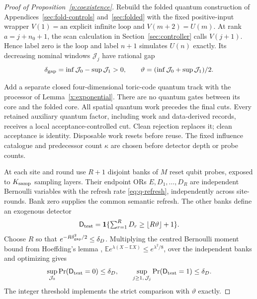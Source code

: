 \begin{proof}[Proof of Proposition~\ref{p:coexistence}]
Rebuild the folded quantum construction of Appendices~\ref{sec:fold-controls}
and~\ref{sec:folded} with the fixed positive-input wrapper
\(V(1)=\text{an explicit infinite loop}\) and \(V(m+2)=U(m)\).
At rank \(a=j+n_0+1\), the scan calculation in
Section~\ref{sec:controller} calls \(V(j+1)\). Hence label zero
is the loop and label \(n+1\) simulates \(U(n)\) exactly.
Its decreasing nominal windows \(\mathcal J_j\) have rational gap
\[
 \delta_{\rm gap}=\inf \mathcal J_0-\sup \mathcal J_1>0,\qquad
 \vartheta=(\inf \mathcal J_0+\sup \mathcal J_1)/2.
\]

Add a separate closed four-dimensional toric-code quantum track
with the processor of Lemma~\ref{x:exponential}. There are no quantum
gates between its core and the folded core. All spatial quantum
work precedes the final cuts. Every retained auxiliary quantum
factor, including work and data-derived records, receives a local
acceptance-controlled cut. Clean rejection replaces it; clean
acceptance is identity. Disposable work resets before reuse.
The fixed influence catalogue and predecessor count \(\kappa\)
are chosen before detector depth or probe counts.

At each site and round use \(R+1\) disjoint banks of \(M\) reset
qubit probes, exposed to \(K_{\rm samp}\) sampling layers. Their
endpoint ORs \(E,D_1,\ldots,D_R\) are independent Bernoulli variables
with the refresh rate \eqref{eq:q-refresh}, independently across
site-rounds. Bank zero supplies the common semantic refresh.
The other banks define an exogenous detector
\[
 \mathsf D_{\rm test}=\mathbf 1\{\textstyle\sum_{r=1}^R D_r\ge
                    \lfloor R\vartheta\rfloor+1\}.
\]
Choose \(R\) so that \(e^{-R\delta_{\rm gap}^2/2}\le\delta_D\).
Multiplying the centred Bernoulli moment bound from Hoeffding's lemma \cite[Lemma~1]{Hoeffding1963},
\(\mathbb E e^{\lambda(X-\mathbb EX)}\le e^{\lambda^2/8}\),
over the independent banks and optimizing gives
\[
 \sup_{\mathcal J_0}\Pr(\mathsf D_{\rm test}=0)\le\delta_D,\qquad
 \sup_{j\ge1,\,\mathcal J_j}\Pr(\mathsf D_{\rm test}=1)\le\delta_D.
\]
The integer threshold implements the strict comparison with
\(\vartheta\) exactly.


\end{proof}
